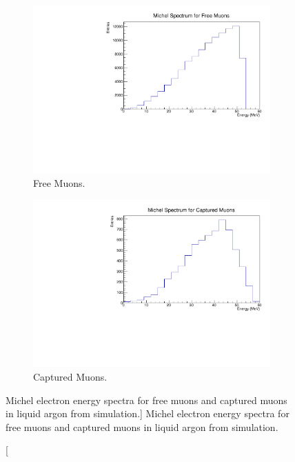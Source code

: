 \begin{figure}

	\centering
	\begin{subfigure}[b]{0.7\textwidth}
		\centering
		\includegraphics[width=\textwidth]{figures/michel_spec_free.pdf}
		\caption {Free Muons.}
		\label{fig:michel_spec_free}
	\end{subfigure}
	\begin{subfigure}[b]{0.7\textwidth}
		\centering
		\includegraphics[width=\textwidth]{figures/michel_spec_cap.pdf}
		\caption {Captured Muons.}
		\label{fig:michel_spec_cap}
	\end{subfigure}

	\caption
	[Michel electron energy spectra for free muons and captured muons in liquid
	argon from \protodune{} simulation.]
	{Michel electron energy spectra for free muons and captured muons in liquid
	argon from \protodune{} simulation.}
	\label{fig:michel_spec}

\end{figure}

